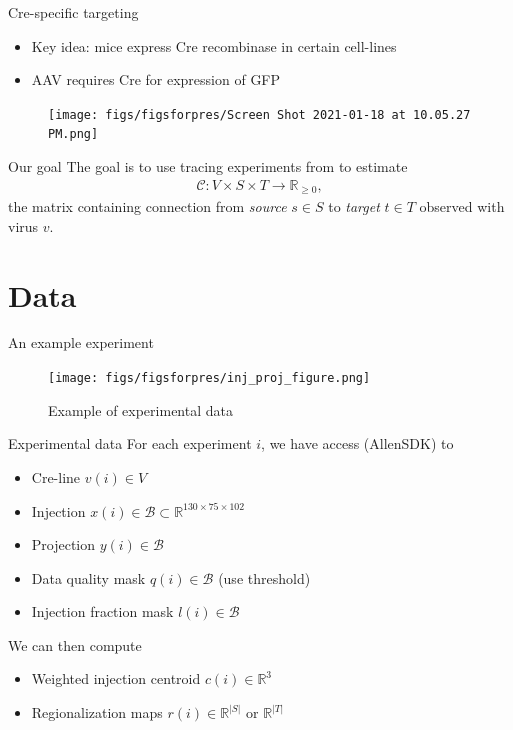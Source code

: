\documentclass{beamer}
\begin{document}
\begin{frame}{Cre-specific targeting}
\begin{itemize}
    \item Key idea: mice express Cre recombinase in certain cell-lines
    \item AAV requires Cre for expression of GFP
\end{itemize}
\begin{figure}
    \centering
    \texttt{[image: figs/figsforpres/Screen Shot 2021-01-18 at 10.05.27 PM.png]}
    \caption{\citeauthor{Harris2019-mr}}
    \label{fig:my_label}
\end{figure}
\end{frame}


\begin{frame}{Our goal}
The goal is to use tracing experiments from \citeauthor{Harris2019-mr} to estimate 
\begin{eqnarray*}
\mathcal C: V \times S \times T \to \mathbb R_{\geq 0},
\end{eqnarray*}
the matrix containing connection from \textit{source} $s \in S$ to \textit{target} $t \in T$ observed with virus  $v$.
\end{frame}

\section{Data}

\begin{frame}{An example experiment}
\begin{figure}
    \centering
    \texttt{[image: figs/figsforpres/inj\_proj\_figure.png]}
    \caption{Example of experimental data}
    \label{fig:my_label}
\end{figure}
\end{frame}

\begin{frame}{Experimental data}
For each experiment $i$, we have access (AllenSDK) to 
\begin{itemize}
    \item Cre-line $v(i) \in V$
    \item Injection $x(i) \in \mathcal B \subset \mathbb R^{130 \times 75 \times 102}$
    \item Projection $y(i) \in \mathcal B $
    \item Data quality mask $q(i) \in \mathcal B$ (use threshold)
    \item Injection fraction mask $l(i) \in \mathcal B$
\end{itemize}
We can then compute
\begin{itemize}
    \item Weighted injection centroid $c(i) \in \mathbb R^3$
    \item Regionalization maps $r(i) \in \mathbb R^{|S|}$ or $\mathbb R^{|T|}$
\end{itemize}
\end{frame}
\end{document}
